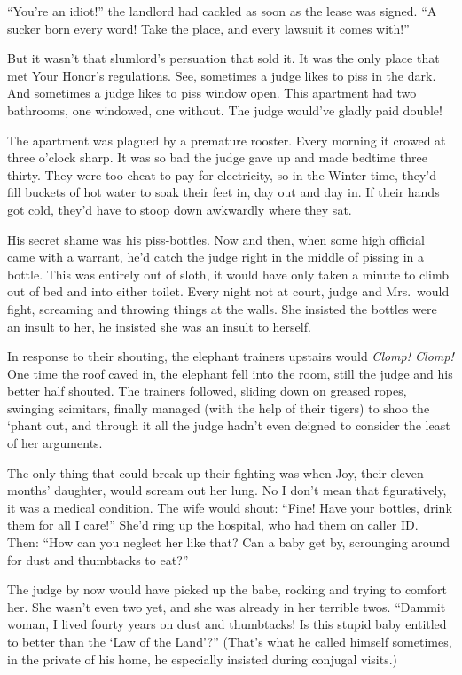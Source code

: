 \documentclass[oneside]{book}
\begin{document}
``You're an idiot!'' the landlord had cackled as soon as the lease was signed.
``A sucker born every word!  Take the place, and every
lawsuit it comes with!''

But it wasn't that slumlord's persuation that sold it.
It was the only place that met Your Honor's regulations.
See, sometimes a judge likes to piss in the dark.
And sometimes a judge likes to piss window open.
This apartment had two bathrooms, one windowed, one without.
The judge would've gladly paid double!

The apartment was plagued by a premature rooster.
Every morning it crowed at three o'clock sharp.
It was so bad the judge gave up and made bedtime
three thirty.  They were too cheat to pay for electricity,
so in the Winter time, they'd fill buckets of hot water
to soak their feet in, day out and day in.  If their hands
got cold, they'd have to stoop down awkwardly where they sat.

His secret shame was his piss-bottles.
Now and then, when some high official came with a warrant,
he'd catch the judge right in the middle of pissing in a bottle.
This was entirely out of sloth,
it would have only taken
a minute to climb out of bed and into either toilet.
Every night not at court, judge and Mrs.~would fight,
screaming and throwing things at the walls.
She insisted the bottles were an insult to her,
he insisted she was an insult to herself.

In response to their shouting, the elephant trainers upstairs
would \emph{Clomp! Clomp!}  One time the roof caved
in, the elephant fell into the room, still the judge and his
better half shouted.  The trainers followed, sliding down on
greased ropes, swinging scimitars, finally managed (with the help
of their tigers) to shoo the `phant out, and through it all the
judge hadn't even deigned to consider the least of her arguments.

The only thing that could break up their fighting
was when Joy, their eleven-months' daughter, would scream out her lung.
No I don't mean that figuratively, it was a medical condition.
The wife would shout: ``Fine!  Have your bottles, drink them for all I care!''
She'd ring up the hospital, who had them on caller ID.
Then:  ``How can you neglect her like that?  Can a baby
get by, scrounging around for dust and thumbtacks to eat?''

The judge by now would have picked up the babe,
rocking and trying to comfort her.  She wasn't even two yet, and she
was already in her terrible twos.  ``Dammit woman, I lived
fourty years on dust and thumbtacks!  Is this stupid baby entitled
to better than the `Law of the Land'?''
(That's what he called himself sometimes, in the private of his home,
he especially insisted during conjugal visits.)
\end{document}
